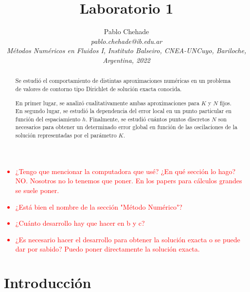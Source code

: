 \documentclass[aps,prb,twocolumn,superscriptaddress,floatfix,longbibliography]{revtex4-2}
\newif\ifptitle
\newif\ifpnumber
\newcounter{para}
\newcommand\ptitle[1]{\par\refstepcounter{para}
{\ifpnumber{\noindent\textcolor{lightgray}{\textbf{\thepara}}\indent}\fi}
{\ifptitle{\textbf{[{#1}]}}\fi}}
\begin{document}
\newcommand{\mytitle}{Laboratorio 1}

\title{\mytitle}

\author{Pablo Chehade \\
    \small \textit{pablo.chehade@ib.edu.ar} \\
    \small \textit{Métodos Numéricos en Fluidos I, Instituto Balseiro, CNEA-UNCuyo, Bariloche, Argentina, 2022} \\}


\begin{abstract}

Se estudió el comportamiento de distintas aproximaciones numéricas en un problema de valores de contorno tipo Dirichlet de solución exacta conocida.

En primer lugar, se analizó cualitativamente ambas aproximaciones para $K$ y $N$ fijos. En segundo lugar, se estudió la dependencia del error local en un punto particular en función del espaciamiento $h$. Finalmente, se estudió cuántos puntos discretos $N$ son necesarios para obtener un determinado error global en función de las oscilaciones de la solución representadas por el parámetro $K$.

\end{abstract}

\maketitle

\textcolor{red}{
\begin{itemize}
    \item ¿Tengo que mencionar la computadora que usé? ¿En qué sección lo hago? NO. Nosotros no lo tenemos que poner. En los papers para cálculos grandes se suele poner.
    \item ¿Está bien el nombre de la sección "Método Numérico"?
    \item ¿Cuánto desarrollo hay que hacer en b y c?
    \item ¿Es necesario hacer el desarrollo para obtener la solución exacta o se puede dar por sabido? Puedo poner directamente la solución exacta.
\end{itemize}}

\section{Introducción}
\ptitle{En física, no todos los problemas tienen solución analítica, muchas veces es necesario recurrir a aproximaciones}
\end{document}
